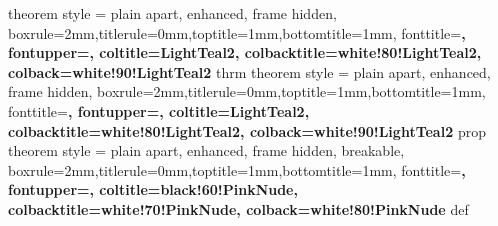 {
	theorem style = plain apart, enhanced, frame hidden,
	boxrule=2mm,titlerule=0mm,toptitle=1mm,bottomtitle=1mm,
	fonttitle=\bfseries\large, fontupper=\normalsize,
	coltitle=LightTeal2, colbacktitle=white!80!LightTeal2,
	colback=white!90!LightTeal2
}{thrm}
{
	theorem style = plain apart, enhanced, frame hidden,
	boxrule=2mm,titlerule=0mm,toptitle=1mm,bottomtitle=1mm,
	fonttitle=\bfseries\large, fontupper=\normalsize,
	coltitle=LightTeal2, colbacktitle=white!80!LightTeal2,
	colback=white!90!LightTeal2
}{prop}
{
	theorem style = plain apart, enhanced, frame hidden, breakable,
	boxrule=2mm,titlerule=0mm,toptitle=1mm,bottomtitle=1mm,
	fonttitle=\bfseries\large, fontupper=\normalsize,
	coltitle=black!60!PinkNude, colbacktitle=white!70!PinkNude,
	colback=white!80!PinkNude
}{def}
\setcounter{chapCnt}{-1} %


\newcommand{\ThumbColIdx}[1]{white!2#1!\HeadingColor}

                   

                   


 \newcommand{\ThumbColor}[1]{%
	\ifcase #1 \ColorDarkTeal %
    \or \ColorCadetBlue %
    \or \ColorGreyBlue %
    \or \ColorMarineBlue %
	\or \ColorBlueSky %
    \or \ColorCornflowerBlue %
    \or \ColorEgyptianBlue %
	\or \ColorBlue %
	\or \ColorPurpleBlue 
	\or \ColorGreen
	\or \ColorPurple
	\else \ColorMyTeal \fi}

